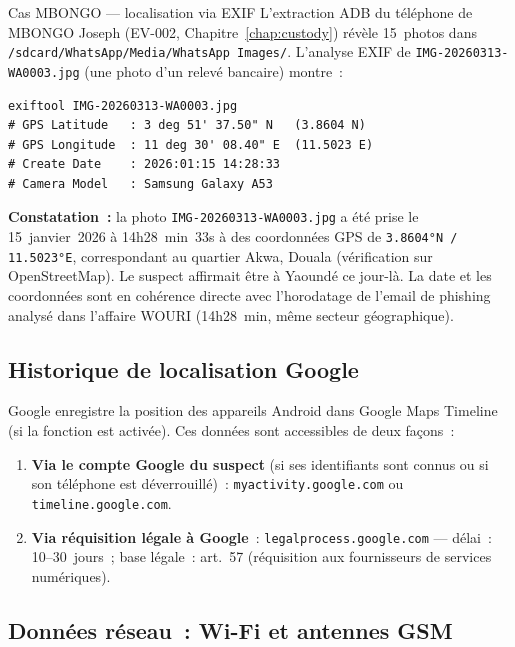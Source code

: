 \begin{boxscenario}{Cas MBONGO --- localisation via EXIF}
L'extraction ADB du téléphone de MBONGO Joseph (EV-002,
Chapitre~\ref{chap:custody}) révèle 15~photos dans
\texttt{/sdcard/WhatsApp/Media/WhatsApp Images/}. L'analyse EXIF
de \texttt{IMG-20260313-WA0003.jpg} (une photo d'un relevé bancaire)
montre~:

\begin{lstlisting}[language=bash_forensique]
exiftool IMG-20260313-WA0003.jpg
# GPS Latitude   : 3 deg 51' 37.50" N   (3.8604 N)
# GPS Longitude  : 11 deg 30' 08.40" E  (11.5023 E)
# Create Date    : 2026:01:15 14:28:33
# Camera Model   : Samsung Galaxy A53
\end{lstlisting}

\textbf{Constatation~:} la photo \texttt{IMG-20260313-WA0003.jpg}
a été prise le 15~janvier~2026 à 14h28~min~33s à des coordonnées GPS
de \texttt{3.8604°N / 11.5023°E}, correspondant au quartier Akwa,
Douala (vérification sur OpenStreetMap). Le suspect affirmait être à
Yaoundé ce jour-là. La date et les coordonnées sont en cohérence directe
avec l'horodatage de l'email de phishing analysé dans l'affaire WOURI
(14h28~min, même secteur géographique).
\end{boxscenario}

\subsection{Historique de localisation Google}

Google enregistre la position des appareils Android dans Google Maps
Timeline (si la fonction est activée). Ces données sont accessibles
de deux façons~:

\begin{enumerate}
    \item \textbf{Via le compte Google du suspect} (si ses identifiants
          sont connus ou si son téléphone est déverrouillé)~:
          \texttt{myactivity.google.com} ou \texttt{timeline.google.com}.
    \item \textbf{Via réquisition légale à Google}~:
          \texttt{legalprocess.google.com} --- délai~: 10--30~jours~;
          base légale~: art.~57  (réquisition aux
          fournisseurs de services numériques).
\end{enumerate}

\subsection{Données réseau~: Wi-Fi et antennes GSM}

